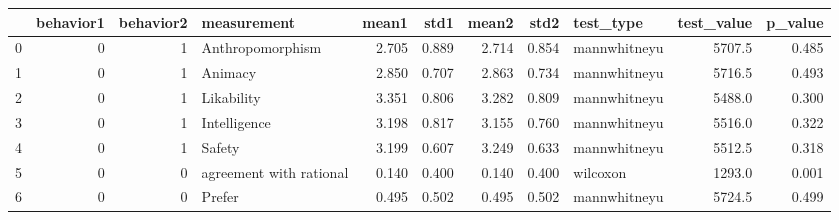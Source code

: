 \begin{tabular}{lrrlrrrrlrr}
\toprule
{} &  behavior1 &  behavior2 &              measurement &  mean1 &   std1 &  mean2 &   std2 &     test\_type &  test\_value &  p\_value \\
\midrule
0 &          0 &          1 &         Anthropomorphism &  2.705 &  0.889 &  2.714 &  0.854 &  mannwhitneyu &      5707.5 &    0.485 \\
1 &          0 &          1 &                  Animacy &  2.850 &  0.707 &  2.863 &  0.734 &  mannwhitneyu &      5716.5 &    0.493 \\
2 &          0 &          1 &               Likability &  3.351 &  0.806 &  3.282 &  0.809 &  mannwhitneyu &      5488.0 &    0.300 \\
3 &          0 &          1 &             Intelligence &  3.198 &  0.817 &  3.155 &  0.760 &  mannwhitneyu &      5516.0 &    0.322 \\
4 &          0 &          1 &                   Safety &  3.199 &  0.607 &  3.249 &  0.633 &  mannwhitneyu &      5512.5 &    0.318 \\
5 &          0 &          0 &  agreement with rational &  0.140 &  0.400 &  0.140 &  0.400 &      wilcoxon &      1293.0 &    0.001 \\
6 &          0 &          0 &                   Prefer &  0.495 &  0.502 &  0.495 &  0.502 &  mannwhitneyu &      5724.5 &    0.499 \\
\bottomrule
\end{tabular}
